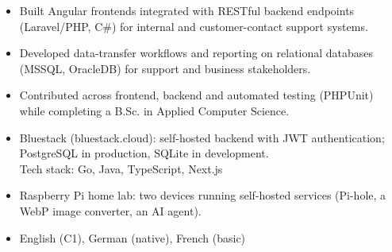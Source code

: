 \documentclass[10pt,letterpaper]{article}
\begin{document}
\begin{itemize}
  \item Built Angular frontends integrated with RESTful backend endpoints (Laravel/PHP, C\#) for internal and customer-contact support systems.
  \item Developed data-transfer workflows and reporting on relational databases (MSSQL, OracleDB) for support and business stakeholders.
  \item Contributed across frontend, backend and automated testing (PHPUnit) while completing a B.Sc. in Applied Computer Science.
\end{itemize}

\begin{itemize}
  \item Bluestack (bluestack.cloud): self-hosted backend with JWT authentication; PostgreSQL in production, SQLite in development.\\
    {\small\color{muted}Tech stack: Go, Java, TypeScript, Next.js}
  \item Raspberry Pi home lab: two devices running self-hosted services (Pi-hole, a WebP image converter, an AI agent).
\end{itemize}

\begin{itemize}
  \item English (C1), German (native), French (basic)
\end{itemize}

\end{document}
